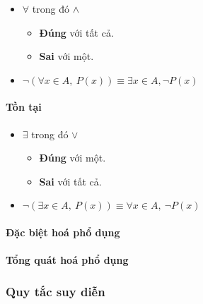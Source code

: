 \documentclass[11pt]{article}
\providecommand{\tightlist}{%
      \setlength{\itemsep}{0pt}\setlength{\parskip}{0pt}}
\begin{document}
    \begin{itemize}
\item
  \(\forall\) trong đó \(\land\)

  \begin{itemize}
  \item
    \textbf{Đúng} với tất cả.
  \item
    \textbf{Sai} với một.
  \end{itemize}
\end{itemize}

    \begin{itemize}
\tightlist
\item
  \(\neg (\forall x \in A, \: P(x)) \equiv \exists x \in A, \neg P(x)\)
\end{itemize}

    \paragraph{Tồn tại}\label{tux1ed3n-tux1ea1i}

    \begin{itemize}
\item
  \(\exists\) trong đó \(\lor\)

  \begin{itemize}
  \item
    \textbf{Đúng} với một.
  \item
    \textbf{Sai} với tất cả.
  \end{itemize}
\end{itemize}

    \begin{itemize}
\tightlist
\item
  \(\neg (\exists x \in A, \: P(x)) \equiv \forall x \in A, \: \neg P(x)\)
\end{itemize}

    \paragraph{Đặc biệt hoá phổ
dụng}\label{ux111ux1eb7c-biux1ec7t-houxe1-phux1ed5-dux1ee5ng}

\paragraph{Tổng quát hoá phổ
dụng}\label{tux1ed5ng-quuxe1t-houxe1-phux1ed5-dux1ee5ng}

    \subsubsection{Quy tắc suy diễn}\label{quy-tux1eafc-suy-diux1ec5n}
\end{document}
